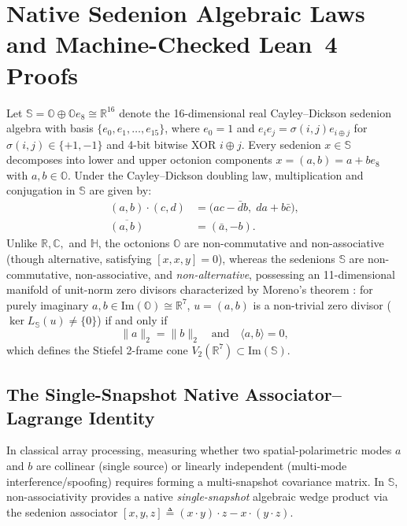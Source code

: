 \documentclass[journal,twoside]{IEEEtran}
\theoremstyle{definition}
\theoremstyle{remark}
\newcommand{\R}{\mathbb{R}}
\newcommand{\C}{\mathbb{C}}
\newcommand{\Ha}{\mathbb{H}}
\newcommand{\Oc}{\mathbb{O}}
\newcommand{\Se}{\mathbb{S}}
\newcommand{\ImPart}{\mathrm{Im}}
\begin{document}
\section{Native Sedenion Algebraic Laws and Machine-Checked Lean~4 Proofs}
\label{sec:theory}
Let $\Se = \Oc \oplus \Oc e_8 \cong \R^{16}$ denote the 16-dimensional real Cayley--Dickson sedenion algebra with basis $\{e_0, e_1, \dots, e_{15}\}$, where $e_0 = 1$ and $e_i e_j = \sigma(i, j) e_{i \oplus j}$ for $\sigma(i,j) \in \{+1, -1\}$ and 4-bit bitwise XOR $i \oplus j$. Every sedenion $x \in \Se$ decomposes into lower and upper octonion components $x = (a, b) = a + b e_8$ with $a, b \in \Oc$. Under the Cayley--Dickson doubling law, multiplication and conjugation in $\Se$ are given by:
\begin{align}
    (a, b) \cdot (c, d) &= \bigl(ac - \bar{d}b,\; da + b\bar{c}\bigr), \label{eq:cd_mul}\\
    \overline{(a, b)} &= (\bar{a}, -b). \label{eq:cd_conj}
\end{align}
Unlike $\R, \C,$ and $\Ha$, the octonions $\Oc$ are non-commutative and non-associative (though alternative, satisfying $[x, x, y] = 0$), whereas the sedenions $\Se$ are non-commutative, non-associative, and \emph{non-alternative}, possessing an 11-dimensional manifold of unit-norm zero divisors characterized by Moreno's theorem \cite{Moreno1998}: for purely imaginary $a, b \in \ImPart(\Oc) \cong \R^7$, $u = (a, b)$ is a non-trivial zero divisor ($\ker L_{\Se}(u) \neq \{0\}$) if and only if
\begin{equation}
    \|a\|_2 = \|b\|_2 \quad \text{and} \quad \langle a, b \rangle = 0,
    \label{eq:moreno_cond}
\end{equation}
which defines the Stiefel 2-frame cone $V_2(\R^7) \subset \ImPart(\Se)$.

\subsection{The Single-Snapshot Native Associator--Lagrange Identity}
In classical array processing, measuring whether two spatial-polarimetric modes $a$ and $b$ are collinear (single source) or linearly independent (multi-mode interference/spoofing) requires forming a multi-snapshot covariance matrix. In $\Se$, non-associativity provides a native \emph{single-snapshot} algebraic wedge product via the sedenion associator $[x, y, z] \triangleq (x\cdot y)\cdot z - x\cdot(y\cdot z)$.
\end{document}
